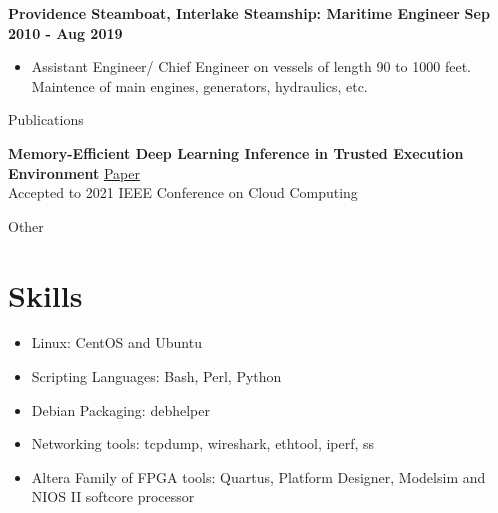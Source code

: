 \documentclass[10pt,a4paper]{article}
\begin{document}
{\begin{tcolorbox}
  \large{\textbf{Providence Steamboat, Interlake Steamship: Maritime Engineer}}
  \hfill
  \large{\textbf{Sep 2010 - Aug 2019}}
  \begin{itemize}[noitemsep]
    \item Assistant Engineer/ Chief Engineer on vessels of length 90 to 1000 feet. Maintence of main engines, generators, hydraulics, etc.
  \end{itemize}

\end{tcolorbox}

\begin{tcolorbox}

  {\selectfont
    \begin{center}
      \LARGE{Publications}
    \end{center}
  }

  \tcblower

  \textbf{Memory-Efficient Deep Learning Inference in Trusted Execution Environment}
  \href{http://arxiv-export-lb.library.cornell.edu/abs/2104.15109?context=cs.LG}{Paper} \\
  Accepted to 2021 IEEE Conference on Cloud Computing \\
\end{tcolorbox}


\begin{tcolorbox}

  {\selectfont
    \begin{center}
      \LARGE{Other}
    \end{center}
  }

  \tcblower

  \section*{Skills}
  \begin{multicols}{2}
  \begin{itemize}[noitemsep]
    \item{Linux: CentOS and Ubuntu}
    \item{Scripting Languages: Bash, Perl, Python}
    \item{Debian Packaging: debhelper}
    \item{Networking tools: tcpdump, wireshark, ethtool, iperf, ss}
    \item{Altera Family of FPGA tools: Quartus, Platform Designer, Modelsim and NIOS II softcore processor}
  \end{itemize}
  \end{multicols}

\end{tcolorbox}

}
\end{document}
